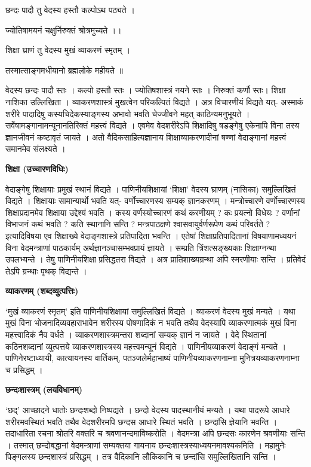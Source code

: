 \documentclass[11pt, a5paper]{article}
\newcommand{\customparagraph}[1]{
    \noindent \textbf{#1} \par
    \penalty 10000 %
    \vspace{0.1cm plus 0.05cm minus 0.02cm}
    \penalty 10000 %
}
\begin{document}
छन्दः पादौ तु वेदस्य हस्तौ कल्पोऽथ पठ्यते ।

ज्योतिषामयनं चक्षुर्निरुक्तं श्रोत्रमुच्यते ।।

शिक्षा घ्राणं तु वेदस्य मुखं व्याकरणं स्मृतम् ।

तस्मात्साङ्गमधीयानो ब्रह्मलोके महीयते ॥

वेदस्य छन्दः पादौ स्तः । कल्पो हस्तौ स्तः । ज्योतिषशास्त्रं नयने स्तः । निरुक्तं कर्णौ स्तः। शिक्षा नाशिका उल्लिखिता । व्याकरणशास्त्रं मुखत्वेन परिकल्पितं विद्यते । अत्र विचारणीयं विद्यते यत्- अस्माकं शरीरे पादादिषु कस्यचिदेकस्याङ्गस्य अभावो भवति चेज्जीवने महत् काठिन्यमनुभूयते । सर्वेषामङ्गानामन्यूनानतिरिक्तं महत्त्वं विद्यते । एवमेव वेदशरीरेऽपि शिक्षादिषु षडङ्गेषु एकेनापि विना तस्य ज्ञानजीवनं कष्टावृतं जायते । अतो वैदिकसाहित्यज्ञानाय शिक्षाव्याकरणादीनां षण्णां वेदाङ्गानां महत्त्वं समानमेव संलक्ष्यते ।

\customparagraph{\textbf{शिक्षा (उच्चारणविधिः)}}

वेदाङ्गेषु शिक्षायाः प्रमुखं स्थानं विद्यते । पाणिनीयशिक्षायां ‘शिक्षा’ वेदस्य घ्राणम् (नासिका) समुल्लिखितं विद्यते । शिक्षायाः सामान्यार्थो भवति यत्- वर्णोच्चारणस्य सम्यक् ज्ञानकरणम् । मन्त्रोच्चारणे वर्णोच्चारणस्य शिक्षाप्रदानमेव शिक्षाया उद्देश्यं भवति । कस्य वर्णस्योच्चारणं कथं करणीयम् ? कः प्रयत्नो विधेयः ? वर्णानां विभाजनं कथं भवति ? कति स्थानानि सन्ति ? मन्त्रपाठक्षणे श्वासवायुर्वर्णरूपेण कथं परिवर्तते ? इत्यादिविषया एव शिक्षाख्ये वेदाङ्गशास्त्रे प्रतिपादिता भवन्ति । एतेषां शिक्षाप्रतिपादितानां विषयाणामध्ययनं विना वेदमन्त्राणां पाठकार्यम् अर्थज्ञानञ्चासम्भवप्रायं ज्ञायते । सम्प्रति त्रिंशत्सङ्‌ख्यकाः शिक्षाग्नन्था उपलभ्यन्ते । तेषुु पाणिनीयशिक्षा प्रसिद्धतरा विद्यते । अत्र प्रातिशाख्यग्रन्था अपि स्मरणीयाः सन्ति । प्रतिवेदं तेऽपि ग्रन्थाः पृथक् विद्यन्ते ।

\customparagraph{\textbf{व्याकरणम् (शब्दव्युत्पत्तिः)}}

‘मुखं व्याकरणं स्मृतम्’ इति पाणिनीयशिक्षायां समुल्लिखितं विद्यते । व्याकरणं वेदस्य मुखं मन्यते । यथा मुखं विना भोजनादिव्यवहाराभावेन शरीरस्य पोषणादिकं न भवति तथैव वेदस्यापि व्याकरणात्मकं मुखं विना महत्त्वादिकं नैव वर्धते । व्याकरणशास्त्रमन्तरा शब्दानां सम्यक् ज्ञानं न जायते । वेदे स्थितानां कठिनशब्दानां व्युत्पत्तये व्याकरणशास्त्रस्य महत्त्वमन्यूनं विद्यते । पाणिनीयव्याकरणं वेदाङ्गं मन्यते । पाणिनेरष्टाध्यायी, कात्यायनस्य वार्तिकम्, पतञ्जलेर्महाभाष्यं पाणिनीयव्याकरणनाम्ना मुनित्रयव्याकरणनाम्ना च प्रसिद्धम् ।

\customparagraph{\textbf{छन्दःशास्त्रम् (लयविधानम्)}}

‘छद्’ आच्छादने धातोः छन्दःशब्दो निष्पद्यते । छन्दो वेदस्य पादस्थानीयं मन्यते । यथा पादरूपे आधारे शरीरमवस्थितं भवति तथैव वेदशरीरमपि छन्दस आधारे स्थितं भवति । छन्दांसि ज्ञेयानि भवन्ति । तदाधारिता रचना श्रोतरि वक्तरि च श्रवणानन्दमाविष्करोति । वेदमन्त्रा अपि छन्दसः कारणेन श्रवणीयाः सन्ति । तस्मात् छन्दोबद्धानां वेदमन्त्राणां सम्यक्तया गायनाय छन्दःशास्त्रस्याध्ययनमावश्यकमिति । महामुनेः पिङ्गलस्य छन्दशास्त्रं प्रसिद्धम् । तत्र वैदिकानि लौकिकानि च छन्दांसि समुल्लिखितानि सन्ति ।
\end{document}
